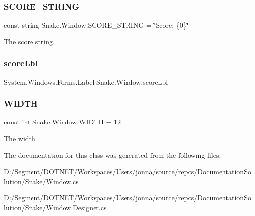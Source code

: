 \subsubsection{\texorpdfstring{S\+C\+O\+R\+E\+\_\+\+S\+T\+R\+I\+NG}{SCORE\_STRING}}
{\footnotesize\ttfamily const string Snake.\+Window.\+S\+C\+O\+R\+E\+\_\+\+S\+T\+R\+I\+NG = \char`\"{}Score\+: \{0\}\char`\"{}\hspace{0.3cm}{\ttfamily [private]}}



The score string. 

\mbox{\label{class_snake_1_1_window_a59d59b9c267f75b0c4b565454f520714}} 
\subsubsection{\texorpdfstring{score\+Lbl}{scoreLbl}}
{\footnotesize\ttfamily System.\+Windows.\+Forms.\+Label Snake.\+Window.\+score\+Lbl\hspace{0.3cm}{\ttfamily [private]}}

\mbox{\label{class_snake_1_1_window_a9062ddbb391d972a1d4463c9dffb92ed}} 
\subsubsection{\texorpdfstring{W\+I\+D\+TH}{WIDTH}}
{\footnotesize\ttfamily const int Snake.\+Window.\+W\+I\+D\+TH = 12\hspace{0.3cm}{\ttfamily [private]}}



The width. 



The documentation for this class was generated from the following files\+:\begin{DoxyCompactItemize}
\item 
D\+:/\+Segment/\+D\+O\+T\+N\+E\+T/\+Workspaces/\+Users/jonna/source/repos/\+Documentation\+Solution/\+Snake/\mbox{\hyperlink{_window_8cs}{Window.\+cs}}\item 
D\+:/\+Segment/\+D\+O\+T\+N\+E\+T/\+Workspaces/\+Users/jonna/source/repos/\+Documentation\+Solution/\+Snake/\mbox{\hyperlink{_window_8_designer_8cs}{Window.\+Designer.\+cs}}\end{DoxyCompactItemize}
